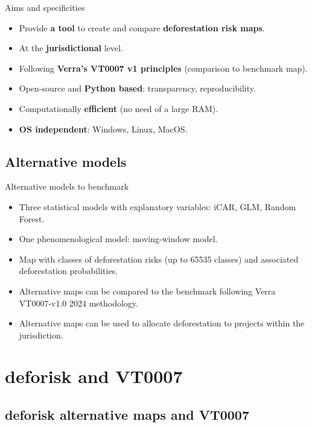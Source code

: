 \documentclass[10pt,table,dvipsnames,compress]{beamer}
\begin{document}
\begin{frame}[label={sec:orgdbf3a1b}]{Aims and specificities}
\begin{itemize}
\item Provide \textbf{a tool} to create and compare \textbf{deforestation risk maps}.
\item At the \textbf{jurisdictional} level.
\item Following \textbf{Verra's VT0007 v1 principles} (comparison to benchmark map).
\item Open-source and \textbf{Python based}: transparency, reproducibility.
\item Computationally \textbf{efficient} (no need of a large RAM).
\item \textbf{OS independent}: Windows, Linux, MacOS.
\end{itemize}
\end{frame}

\subsection{Alternative models}
\label{sec:orgee36938}

\begin{frame}[label={sec:orgb8af580}]{Alternative models to benchmark}
\begin{itemize}
\item Three statistical models with explanatory variables: iCAR, GLM, Random Forest.
\item One phenomenological model: moving-window model.
\item Map with classes of deforestation risks (up to 65535 classes) and associated deforestation probabilities.
\item Alternative maps can be compared to the benchmark following Verra VT0007-v1.0 2024 methodology.
\item Alternative maps can be used to allocate deforestation to projects within the jurisdiction.
\end{itemize}
\end{frame}

\section{deforisk and VT0007}
\label{sec:orgf90f1de}

\subsection{deforisk alternative maps and VT0007}
\label{sec:org60b74a9}
\end{document}
